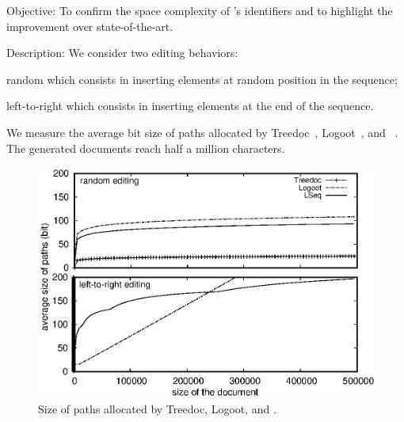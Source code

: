 \begin{asparadesc}
\item [Objective:] To confirm the space complexity of \LSEQ's identifiers and to
  highlight the improvement over state-of-the-art.
\item [Description:] We consider two editing behaviors:
  \begin{inparaenum}[(i)]
  \item random which consists in inserting elements at random position in the sequence;
  \item left-to-right which consists in inserting elements at the end of the
    sequence.
  \end{inparaenum} We measure the average bit size of paths allocated by
  Treedoc~\cite{preguica2009commutative}, Logoot~\cite{weiss2009logoot}, and
  \LSEQ~\cite{nedelec2013lseq}. The generated documents reach half a million
  characters.

\begin{figure}
  \centering
  \includegraphics[width=\FIGUREWIDTH\textwidth]{./img/space.eps}
  \caption{\label{fig:space}Size of paths allocated by Treedoc, Logoot, and
    \LSEQ.}
\end{figure}


\end{asparadesc}
